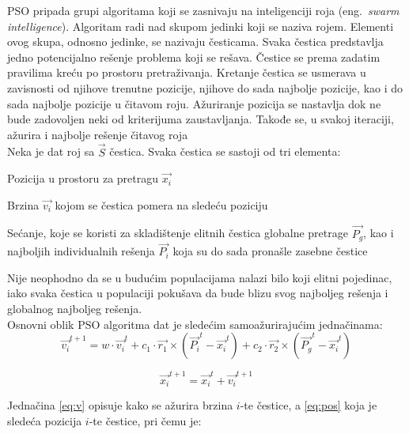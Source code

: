 \documentclass[a4paper]{article}
\begin{document}
PSO pripada grupi algoritama koji se zasnivaju na inteligenciji roja
(eng.~{\em swarm intelligence}). Algoritam radi nad skupom jedinki koji se naziva rojem. 
Elementi ovog skupa, odnosno jedinke, se nazivaju česticama. 
Svaka čestica predstavlja jedno potencijalno rešenje problema koji se rešava. 
Čestice se prema zadatim pravilima kreću po prostoru pretraživanja. 
Kretanje čestica se usmerava u zavisnosti od njihove trenutne pozicije, 
njihove do sada najbolje pozicije, kao i do sada najbolje pozicije u čitavom roju. 
Ažuriranje pozicija se nastavlja dok ne bude zadovoljen neki od kriterijuma zaustavljanja.
Takođe se, u svakoj iteraciji, ažurira i najbolje rešenje čitavog roja \\


Neka je dat roj sa $\vec{S}$ čestica. Svaka čestica se sastoji od tri elementa:
\begin{list}{•}{}
	\item Pozicija u prostoru za pretragu $\vec{x_i}$
	\item Brzina $\vec{v_i}$ kojom se čestica pomera na sledeću poziciju
	\item Sećanje, koje se koristi za skladištenje elitnih čestica 
	globalne pretrage $\vec{P_g}$, kao i najboljih individualnih 
	rešenja $\vec{P_i}$ koja su do sada pronašle zasebne čestice\\
\end{list}

Nije neophodno da se u budućim populacijama nalazi bilo koji elitni pojedinac, iako svaka čestica u populaciji pokušava da bude blizu svog najboljeg rešenja i globalnog najboljeg rešenja. \\ 


Osnovni oblik PSO algoritma dat je sledećim samoažurirajućim jednačinama: \\ 
\begin{equation}\label{eq:v}
\vec{v_{i}}^{t+1} = w \cdot \vec{v_{i}}^{t} + c_1 \cdot \vec{r_1} \times (\vec{P_{i}}^{t} - \vec{x_{i}}^{t}) + c_2\cdot \vec{r_2} \times (\vec{P_{g}}^{t} - \vec{x_{i}}^{t}) 
\end{equation}

\begin{equation}\label{eq:pos}
\vec{x_{i}}^{t+1} = \vec{x_{i}}^{t} + \vec{v_{i}}^{t+1} 
\end{equation}

Jednačina \ref{eq:v} opisuje kako se ažurira brzina $i$-te čestice, a \ref{eq:pos} koja je sledeća pozicija $i$-te čestice, pri čemu je: 
\end{document}
